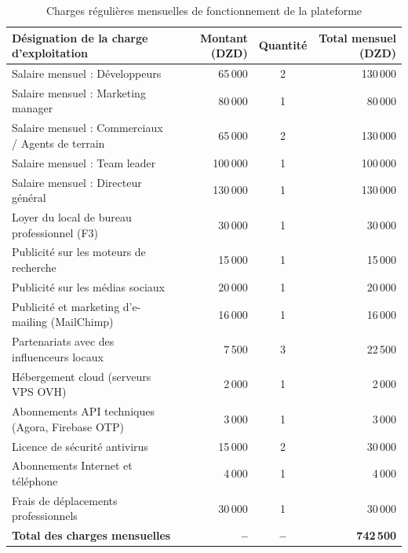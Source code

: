 \documentclass[11pt,a4paper]{article}
\begin{document}
\begin{table}[H]
\centering
\small
\begin{tabularx}{\textwidth}{|X|r|c|r|}
\hline
\rowcolor{bmclightgreen}
\textbf{Désignation de la charge d'exploitation} & \textbf{Montant (DZD)} & \textbf{Quantité} & \textbf{Total mensuel (DZD)} \\
\hline
Salaire mensuel : Développeurs & 65\,000 & 2 & 130\,000 \\
\hline
Salaire mensuel : Marketing manager & 80\,000 & 1 & 80\,000 \\
\hline
Salaire mensuel : Commerciaux / Agents de terrain & 65\,000 & 2 & 130\,000 \\
\hline
Salaire mensuel : Team leader & 100\,000 & 1 & 100\,000 \\
\hline
Salaire mensuel : Directeur général & 130\,000 & 1 & 130\,000 \\
\hline
Loyer du local de bureau professionnel (F3) & 30\,000 & 1 & 30\,000 \\
\hline
Publicité sur les moteurs de recherche & 15\,000 & 1 & 15\,000 \\
\hline
Publicité sur les médias sociaux & 20\,000 & 1 & 20\,000 \\
\hline
Publicité et marketing d'e-mailing (MailChimp) & 16\,000 & 1 & 16\,000 \\
\hline
Partenariats avec des influenceurs locaux & 7\,500 & 3 & 22\,500 \\
\hline
Hébergement cloud (serveurs VPS OVH) & 2\,000 & 1 & 2\,000 \\
\hline
Abonnements API techniques (Agora, Firebase OTP) & 3\,000 & 1 & 3\,000 \\
\hline
Licence de sécurité antivirus & 15\,000 & 2 & 30\,000 \\
\hline
Abonnements Internet et téléphone & 4\,000 & 1 & 4\,000 \\
\hline
Frais de déplacements professionnels & 30\,000 & 1 & 30\,000 \\
\hline
\rowcolor{bmclightgreen}
\textbf{Total des charges mensuelles} & \textbf{--} & \textbf{--} & \textbf{742\,500} \\
\hline
\end{tabularx}
\caption{Charges régulières mensuelles de fonctionnement de la plateforme}
\label{tab:depenses}
\end{table}
\end{document}
